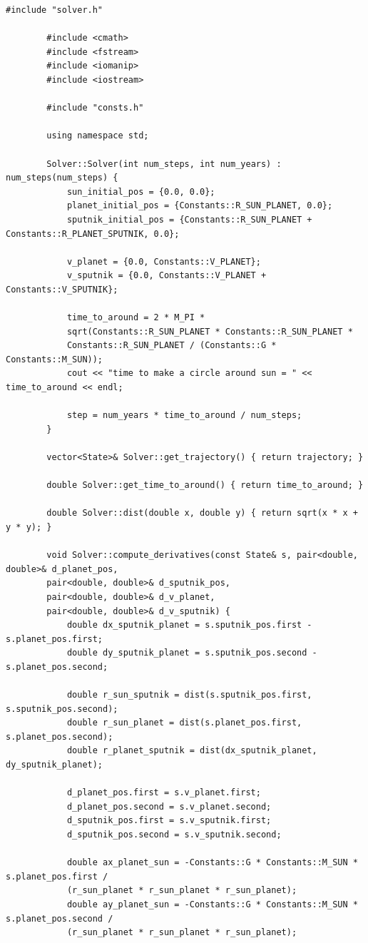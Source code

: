 \documentclass[14pt,a4paper]{extarticle}
\theoremstyle{plain}
\begin{document}
	\begin{lstlisting}[title=solver.cpp, gobble=16, breaklines=true, breakatwhitespace=true]
		#include "solver.h"
		
		#include <cmath>
		#include <fstream>
		#include <iomanip>
		#include <iostream>
		
		#include "consts.h"
		
		using namespace std;
		
		Solver::Solver(int num_steps, int num_years) : num_steps(num_steps) {
			sun_initial_pos = {0.0, 0.0};
			planet_initial_pos = {Constants::R_SUN_PLANET, 0.0};
			sputnik_initial_pos = {Constants::R_SUN_PLANET + Constants::R_PLANET_SPUTNIK, 0.0};
			
			v_planet = {0.0, Constants::V_PLANET};
			v_sputnik = {0.0, Constants::V_PLANET + Constants::V_SPUTNIK};
			
			time_to_around = 2 * M_PI *
			sqrt(Constants::R_SUN_PLANET * Constants::R_SUN_PLANET *
			Constants::R_SUN_PLANET / (Constants::G * Constants::M_SUN));
			cout << "time to make a circle around sun = " << time_to_around << endl;
			
			step = num_years * time_to_around / num_steps;
		}
		
		vector<State>& Solver::get_trajectory() { return trajectory; }
		
		double Solver::get_time_to_around() { return time_to_around; }
		
		double Solver::dist(double x, double y) { return sqrt(x * x + y * y); }
		
		void Solver::compute_derivatives(const State& s, pair<double, double>& d_planet_pos,
		pair<double, double>& d_sputnik_pos,
		pair<double, double>& d_v_planet,
		pair<double, double>& d_v_sputnik) {
			double dx_sputnik_planet = s.sputnik_pos.first - s.planet_pos.first;
			double dy_sputnik_planet = s.sputnik_pos.second - s.planet_pos.second;
			
			double r_sun_sputnik = dist(s.sputnik_pos.first, s.sputnik_pos.second);
			double r_sun_planet = dist(s.planet_pos.first, s.planet_pos.second);
			double r_planet_sputnik = dist(dx_sputnik_planet, dy_sputnik_planet);
			
			d_planet_pos.first = s.v_planet.first;
			d_planet_pos.second = s.v_planet.second;
			d_sputnik_pos.first = s.v_sputnik.first;
			d_sputnik_pos.second = s.v_sputnik.second;
			
			double ax_planet_sun = -Constants::G * Constants::M_SUN * s.planet_pos.first /
			(r_sun_planet * r_sun_planet * r_sun_planet);
			double ay_planet_sun = -Constants::G * Constants::M_SUN * s.planet_pos.second /
			(r_sun_planet * r_sun_planet * r_sun_planet);
			

\end{lstlisting}
\end{document}
